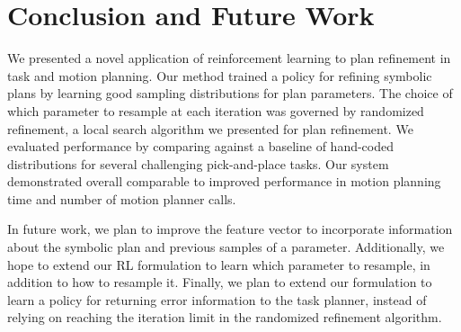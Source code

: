 \section{Conclusion and Future Work}
We presented a novel application of reinforcement learning to plan refinement in task
and motion planning. Our method trained a policy for refining symbolic plans
by learning good sampling distributions for plan parameters. The choice
of which parameter to resample at each iteration was governed by randomized refinement,
a local search algorithm we presented for plan refinement. We evaluated
performance by comparing against a baseline of hand-coded distributions
for several challenging pick-and-place tasks. Our system demonstrated overall comparable
to improved performance in motion planning time and number of motion planner calls.

In future work, we plan to improve the feature vector to incorporate information about
the symbolic plan and previous samples of a parameter. Additionally, we hope
to extend our RL formulation to learn which parameter to resample, in addition to how
to resample it. Finally, we plan to extend our formulation to learn a policy for
returning error information to the task planner, instead of relying on reaching
the iteration limit in the randomized refinement algorithm.
